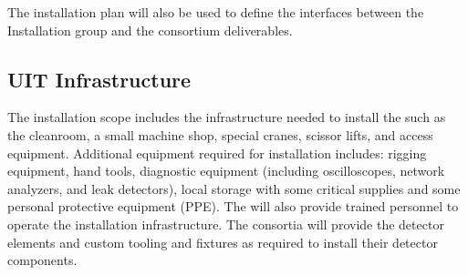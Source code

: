 The installation plan will also be used to define the interfaces
between the Installation group and the consortium deliverables.

\subsection{UIT Infrastructure}

The installation scope includes the infrastructure needed to install
the  such as the cleanroom, a small machine shop, special
cranes, scissor lifts, and access equipment.  Additional equipment
required for installation includes: rigging equipment, hand tools,
diagnostic equipment (including oscilloscopes, network analyzers, and
leak detectors), local storage with some critical supplies and some
personal protective equipment (PPE). The  will also provide
trained personnel to operate the installation infrastructure. The
consortia will provide the detector elements and custom tooling and
fixtures as required to install their detector components.
